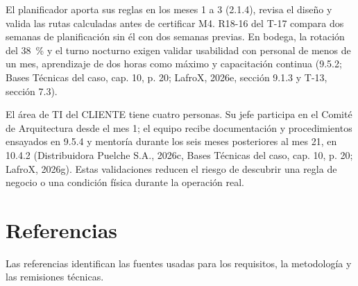 El planificador aporta sus reglas en los meses 1 a 3 (2.1.4), revisa el diseño y valida las rutas calculadas antes de certificar M4. R18-16 del T-17 compara dos semanas de planificación sin él con dos semanas previas. En bodega, la rotación del 38~\% y el turno nocturno exigen validar usabilidad con personal de menos de un mes, aprendizaje de dos horas como máximo y capacitación continua (9.5.2; Bases Técnicas del caso, cap. 10, p. 20; LafroX, 2026e, sección 9.1.3 y T-13, sección 7.3).

El área de TI del CLIENTE tiene cuatro personas. Su jefe participa en el Comité de Arquitectura desde el mes 1; el equipo recibe documentación y procedimientos ensayados en 9.5.4 y mentoría durante los seis meses posteriores al mes 21, en 10.4.2 (Distribuidora Puelche S.A., 2026c, Bases Técnicas del caso, cap. 10, p. 20; LafroX, 2026g). Estas validaciones reducen el riesgo de descubrir una regla de negocio o una condición física durante la operación real.

\clearpage
{}
\section*{Referencias}

Las referencias identifican las fuentes usadas para los requisitos, la metodología y las remisiones técnicas.

